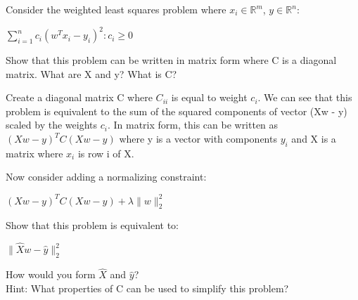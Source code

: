 \begin{Parts}

\Part Consider the weighted least squares problem where $x_i \in \mathbb{R}^m$, $y \in \mathbb{R}^n$:
\begin{center}
$\sum_{i=1}^{n}{c_i (w^Tx_i - y_i)^2} : c_i \geq 0$  \\
\end{center}

Show that this problem can be written in matrix form where C is a diagonal matrix. What are X and y? What is C?

\begin{solution}
\indent Create a diagonal matrix C where $C_{ii}$ is equal to weight $c_i$. We can see \indent that this problem is equivalent to the sum of the squared components of \indent vector (Xw - y) scaled by the weights $c_i$. In matrix form, this can be written \indent as $(Xw - y)^TC(Xw - y)$ where y is a vector with components $y_i$ and X is a matrix where $x_i$ is row i of X.
\end{solution}

\Part Now consider adding a normalizing constraint:

\begin{center}
\indent $(Xw - y)^{T}C(Xw - y)  + \lambda \|w\|_2^2$ \\
\end{center}
Show that this problem is equivalent to:
\begin{center}
$\| \hat{X}w - \hat{y} \|_2^2$  \\
\end{center}
How would you form $\hat{X}$ and $\hat{y}$? \\
Hint: What properties of C can be used to simplify this problem?


\end{Parts}
